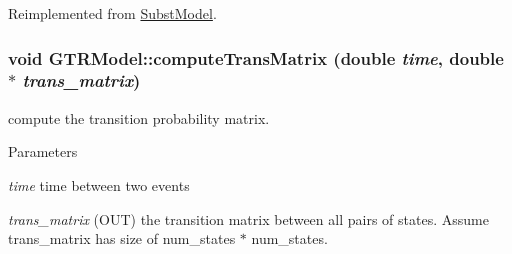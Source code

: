 Reimplemented from \hyperlink{classSubstModel_ada88db5c6befc33de5ddb590667ba865}{SubstModel}.\hypertarget{classGTRModel_aa779b66b3824c4e956db7b56dee668c2}{
\subsubsection[{computeTransMatrix}]{\setlength{\rightskip}{0pt plus 5cm}void GTRModel::computeTransMatrix (double {\em time}, \/  double $\ast$ {\em trans\_\-matrix})}}
\label{classGTRModel_aa779b66b3824c4e956db7b56dee668c2}
compute the transition probability matrix. 
\begin{DoxyParams}{Parameters}
\item[{\em time}]time between two events \item[{\em trans\_\-matrix}](OUT) the transition matrix between all pairs of states. Assume trans\_\-matrix has size of num\_\-states $\ast$ num\_\-states. \end{DoxyParams}


